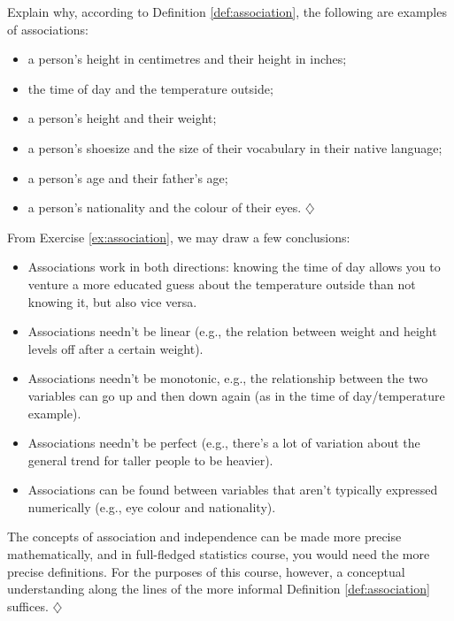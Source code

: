 \documentclass[a4paper]{tufte-book}\usepackage[]{graphicx}\usepackage[]{xcolor}
\newcommand*{\parend}[1][$\diamondsuit$]{%
  \unskip\nobreak\hspace{1em plus 1fill}$\diamondsuit$%
}
\begin{document}
\label{ex:association}
Explain why, according to Definition \ref{def:association}, 
the following are examples of associations:

\begin{itemize}
 \item a person's height in centimetres and their height in inches;
 \item the time of day and the temperature outside;
 \item a person's height and their weight;
 \item a person's shoesize and the size of their vocabulary in their native language;
 \item a person's age and their father's age;
 \item a person's nationality and the colour of their eyes. \parend
\end{itemize}

From Exercise \ref{ex:association}, we may draw a few conclusions:
\begin{itemize}
  \item Associations work in both directions: knowing the time of day
allows you to venture a more educated guess about the temperature outside
than not knowing it, but also vice versa.

  \item Associations needn't be linear 
  (e.g., the relation between weight and height levels off after a certain weight).

  \item Associations needn't be monotonic, 
  e.g., the relationship between the two variables can go up and 
  then down again (as in the time of day/temperature example).

  \item Associations needn't be perfect 
  (e.g., there's a lot of variation about the general trend for 
  taller people to be heavier).

  \item Associations can be found between variables that aren't 
  typically expressed numerically 
  (e.g., eye colour and nationality).
\end{itemize}

\clearpage

The concepts of association and independence can be made more precise
mathematically, and in full-fledged statistics course,
you would need the more precise definitions.
For the purposes of this course, however, a conceptual understanding
along the lines of the more informal Definition \ref{def:association} suffices.
\parend
\end{document}
